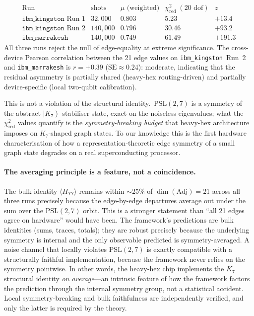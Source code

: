 \documentclass[11pt]{article}
\newcommand{\Adj}{\mathrm{Adj}}
\newcommand{\ket}[1]{\left|#1\right\rangle}
\begin{document}
\begin{equation}
  \label{eq:psl27-table}
  \begin{array}{l|cccc}
    \text{Run} & \text{shots} & \mu\text{ (weighted)} & \chi^2_{\text{red}}\;(20\text{ dof}) & z \\\hline
    \texttt{ibm\_kingston} \text{ Run 1}   &  32{,}000 & 0.803 &  5.23 &  +13.4 \\
    \texttt{ibm\_kingston} \text{ Run 2}   & 140{,}000 & 0.796 & 30.46 &  +93.2 \\
    \texttt{ibm\_marrakesh}                & 140{,}000 & 0.749 & 61.49 & +191.3
  \end{array}
\end{equation}
All three runs reject the null of edge-equality at extreme
significance.  The cross-device Pearson correlation between the
21 edge values on \texttt{ibm\_kingston}~Run~2 and
\texttt{ibm\_marrakesh} is $r = +0.39$ ($\mathrm{SE} \approx 0.24$):
moderate, indicating that the residual asymmetry is partially
shared (heavy-hex routing-driven) and partially device-specific
(local two-qubit calibration).

This is not a violation of the structural identity.\
$\mathrm{PSL}(2,7)$ is a symmetry of the abstract $\ket{K_7}$
stabiliser state, exact on the noiseless eigenvalues; what the
$\chi^2_{\text{red}}$ values quantify is the
\emph{symmetry-breaking budget} that heavy-hex architecture imposes
on $K_7$-shaped graph states.  To our knowledge this is the first
hardware characterisation of how a representation-theoretic edge
symmetry of a small graph state degrades on a real superconducting
processor.

\paragraph{The averaging principle is a feature, not a coincidence.}
The bulk identity $\langle H_{YY}\rangle$ remains within $\sim 25\%$
of $\dim(\Adj) = 21$ across all three runs precisely because the
edge-by-edge departures average out under the sum over the
$\mathrm{PSL}(2,7)$ orbit.  This is a stronger statement than ``all
21 edges agree on hardware'' would have been.  The framework's
predictions are bulk identities (sums, traces, totals); they are
robust precisely because the underlying symmetry is internal and
the only observable predicted is symmetry-averaged.  A noise
channel that locally violates $\mathrm{PSL}(2,7)$ is exactly
compatible with a structurally faithful implementation, because
the framework never relies on the symmetry pointwise.  In other
words, the heavy-hex chip implements the $K_7$ structural identity
\emph{on average}---an intrinsic feature of how the framework
factors the prediction through the internal symmetry group, not a
statistical accident.  Local symmetry-breaking and bulk
faithfulness are independently verified, and only the latter is
required by the theory.
\end{document}

